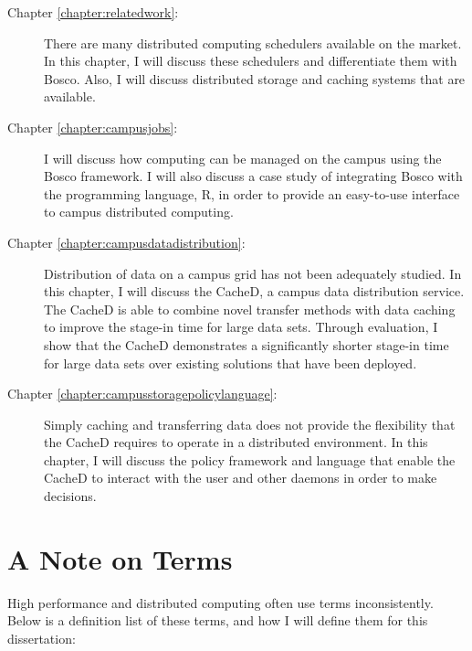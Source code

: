 \begin{description}
	\item[Chapter \ref{chapter:relatedwork}:]  There are many distributed computing schedulers available on the market.  In this chapter, I will discuss these schedulers and differentiate them with Bosco.  Also, I will discuss distributed storage and caching systems that are available.
	
	\item[Chapter \ref{chapter:campusjobs}:] I will discuss how computing can be managed on the campus using the Bosco framework.  I will also discuss a case study of integrating Bosco with the programming language, R, in order to provide an easy-to-use interface to campus distributed computing.
	
	\item[Chapter \ref{chapter:campusdatadistribution}:] Distribution of data on a campus grid has not been adequately studied.  In this chapter, I will discuss the CacheD, a campus data distribution service.  The CacheD is able to combine novel transfer methods with data caching to improve the stage-in time for large data sets.  Through evaluation, I show that the CacheD demonstrates a significantly shorter stage-in time for large data sets over existing solutions that have been deployed.
	
	\item[Chapter \ref{chapter:campusstoragepolicylanguage}:]  
	Simply caching and transferring data does not provide the flexibility that the CacheD requires to operate in a distributed environment.  In this chapter, I will discuss the policy framework and language that enable the CacheD to interact with the user and other daemons in order to make decisions.
\end{description}


\newpage
\section{A Note on Terms}
High performance and distributed computing often use terms inconsistently.  Below is a definition list of these terms, and how I will define them for this dissertation:


